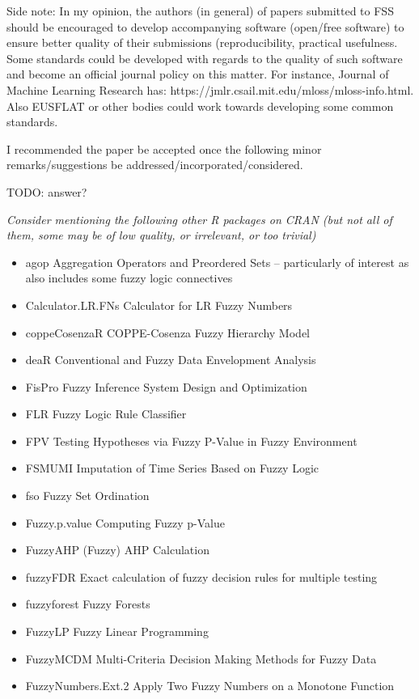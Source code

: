 \documentclass{article}
\newcommand{\todo}[1]{{\color{red} TODO: #1}}
\begin{document}
{Side note: In my opinion, the authors (in general) of papers submitted to FSS should be encouraged to develop accompanying software (open/free software) to ensure better quality of their submissions (reproducibility, practical usefulness. Some standards could be developed with regards to the quality of such software and become an official journal policy on this matter. For instance, Journal of Machine Learning Research has: https://jmlr.csail.mit.edu/mloss/mloss-info.html. Also EUSFLAT or other bodies could work towards developing some common standards.

I recommended the paper be accepted once the following minor remarks/suggestions be addressed/incorporated/considered.}

\todo{answer?}

{\it Consider mentioning the following other R packages on CRAN (but not all of them, some may be of low quality, or irrelevant, or too trivial)
\begin{itemize}
    \item agop Aggregation Operators and Preordered Sets -- particularly of interest as also includes some fuzzy logic connectives
    \item Calculator.LR.FNs Calculator for LR Fuzzy Numbers
    \item coppeCosenzaR COPPE-Cosenza Fuzzy Hierarchy Model
    \item deaR Conventional and Fuzzy Data Envelopment Analysis
    \item FisPro Fuzzy Inference System Design and Optimization
    \item FLR Fuzzy Logic Rule Classifier
    \item FPV Testing Hypotheses via Fuzzy P-Value in Fuzzy Environment
    \item FSMUMI Imputation of Time Series Based on Fuzzy Logic
    \item fso Fuzzy Set Ordination
    \item Fuzzy.p.value Computing Fuzzy p-Value
    \item FuzzyAHP (Fuzzy) AHP Calculation
    \item fuzzyFDR Exact calculation of fuzzy decision rules for multiple testing
    \item fuzzyforest Fuzzy Forests
    \item FuzzyLP Fuzzy Linear Programming
    \item FuzzyMCDM Multi-Criteria Decision Making Methods for Fuzzy Data
    \item FuzzyNumbers.Ext.2 Apply Two Fuzzy Numbers on a Monotone Function

\end{itemize}}
\end{document}

